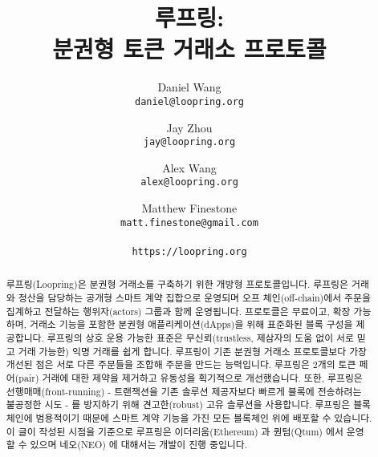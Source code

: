\documentclass[UTF8,nofonts]{article}
\title{\textbf{루프링:}\\\textbf{분권형 토큰 거래소 프로토콜}}
\author{
  Daniel Wang\\
  \texttt{daniel@loopring.org}\\
  \and
  	Jay Zhou\\
  	\texttt{jay@loopring.org}\\
  	\and
  	Alex Wang\\
  	\texttt{alex@loopring.org}\\
  	\and
  	Matthew Finestone\\
  	\texttt{matt.finestone@gmail.com}\\ 
  \\
  \texttt{https://loopring.org}
 }
\begin{document}
\maketitle


\begin{abstract}
루프링(Loopring)은 분권형 거래소를 구축하기 위한 개방형 프로토콜입니다. 루프링은 거래와 정산을 담당하는 공개형 스마트 계약 집합으로 운영되며 오프 체인(off-chain)에서 주문을 집계하고 전달하는 행위자(actors) 그룹과 함께 운영됩니다. 프로토콜은 무료이고, 확장 가능하며, 거래소 기능을 포함한 분권형 애플리케이션(dApps)을 위해 표준화된 블록 구성을 제공합니다. 루프링의 상호 운용 가능한 표준은 무신뢰(trustless, 제삼자의 도움 없이 서로 믿고 거래 가능한) 익명 거래를 쉽게 합니다. 루프링이 기존 분권형 거래소 프로토콜보다 가장 개선된 점은 서로 다른 주문들을 조합해 주문을 만드는 능력입니다. 루프링은 2개의 토큰 페어(pair) 거래에 대한 제약을 제거하고 유동성을 획기적으로 개선했습니다. 또한, 루프링은 선행매매(front-running) - 트랜잭션을 기존 솔루션 제공자보다 빠르게 블록에 전송하려는 불공정한 시도 - 를 방지하기 위해 견고한(robust) 고유 솔루션을 사용합니다. 루프링은 블록체인에 범용적이기 때문에 스마트 계약 기능을 가진 모든 블록체인 위에 배포할 수 있습니다. 이 글이 작성된 시점을 기준으로 루프링은 이더리움(Ethereum) \cite{buterin2017ethereum} \cite{wood2014ethereum} 과 퀀텀(Qtum) \cite{dai2017smart}에서 운영할 수 있으며 네오(NEO) \cite{atterlonn2018distributed}에 대해서는 개발이 진행 중입니다. 
\end{abstract}
\end{document}
